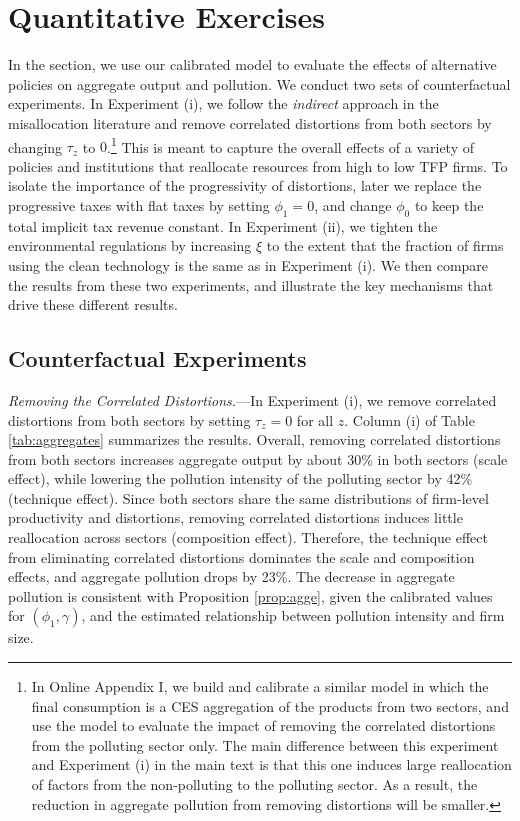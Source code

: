 \documentclass[AEJ]{AEA}
\begin{document}
\section{Quantitative Exercises}

In the section, we use our calibrated model to evaluate the effects of alternative policies on aggregate output and pollution. We conduct two sets of counterfactual experiments.  In Experiment (i), we follow the \emph{indirect} approach in the misallocation literature and remove correlated distortions from both sectors by changing $\tau_z$ to $0$.\footnote{In Online Appendix I, we build and calibrate a similar model in which the final consumption is a CES aggregation of the products from two sectors, and use the model to evaluate the impact of removing the correlated distortions from the polluting sector only. The main difference between this experiment and Experiment (i) in the main text is that this one induces large reallocation of factors from the non-polluting to the polluting sector. As a result, the reduction in aggregate pollution from removing distortions will be smaller. } This is meant to capture the overall effects of a variety of policies and institutions that reallocate resources from high to low TFP firms. To isolate the importance of the {progressivity} of distortions, later we replace the progressive taxes with flat taxes by setting $\phi_1=0$, and change $\phi_0$ to keep the total implicit tax revenue constant. In Experiment (ii), we tighten the environmental regulations by increasing $\xi$ to the extent that the fraction of firms using the clean technology is the same as in Experiment (i). We then compare the results from these two experiments, and illustrate the key mechanisms that drive these different results.

\subsection{Counterfactual Experiments}

\textit{Removing the Correlated Distortions.}---In Experiment (i), we remove correlated distortions from both sectors by setting $\tau_z = 0$ for all $z$. Column (i) of Table \ref{tab:aggregates} summarizes the results. Overall, removing correlated distortions from both sectors increases aggregate output by about 30\% in both sectors (scale effect), while lowering the pollution intensity of the polluting sector by 42\% (technique effect). Since both sectors share the same distributions of firm-level productivity and distortions, removing correlated distortions induces little reallocation across sectors (composition effect). Therefore, the technique effect from eliminating correlated distortions dominates the scale and composition effects, and aggregate pollution drops by 23\%. The decrease in aggregate pollution is consistent with Proposition \ref{prop:agge}, given the calibrated values for $(\phi_1, \gamma)$, and the estimated relationship between pollution intensity and firm size. %
\end{document}
